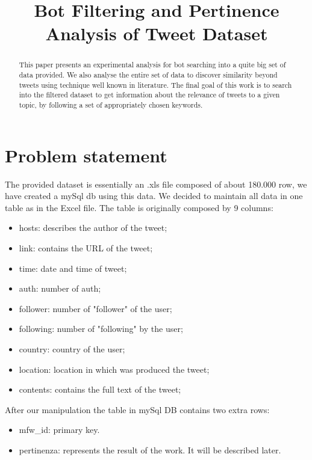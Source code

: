 \documentclass[conference, onecolumn]{IEEEtran}
\begin{document}
\title{{Bot Filtering and Pertinence Analysis of Tweet Dataset}}

\author{
}

\maketitle

\begin{abstract}
	This paper presents an experimental analysis for bot searching into a quite big set of data provided. We also analyse the entire set of data to discover similarity beyond tweets using technique well known in literature. The final goal of this work is to search into the filtered dataset to get information about the relevance of tweets to a given topic, by following a set of appropriately chosen keywords.
\end{abstract}

\section{Problem statement}\label{sec:intro}
\medskip
The provided dataset is essentially an .xls file composed of about 180.000 row, we have created a mySql db using this data. We decided to maintain all data in one table as in the Excel file. The table is originally composed by 9 columns:
\begin{itemize}
	\item hosts: describes the author of the tweet;
	\item link: contains the URL of the tweet;
	\item time: date and time of tweet;
	\item auth: number of auth;
	\item follower: number of "follower" of the user; 
	\item following: number of "following" by the user;
	\item country: country of the user;
	\item location: location in which was produced the tweet;
	\item contents: contains the full text of the tweet;
\end{itemize}
After our manipulation the table in mySql DB contains two extra rows:
\begin{itemize}
	\item mfw\_id: primary key.
	\item pertinenza: represents the result of the work. It will be described later.
\end{itemize}
\end{document}
